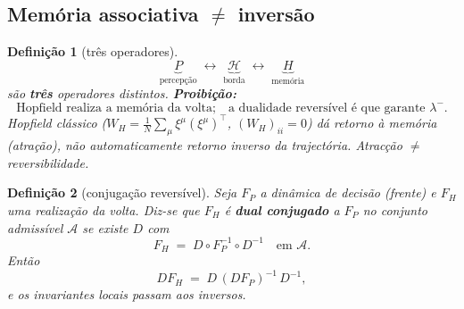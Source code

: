 \documentclass[11pt,a4paper]{article}
\newtheorem{definicao}{Definição}
\begin{document}
\subsection*{Memória associativa $\neq$ inversão}

\begin{definicao}[três operadores]\label{def:tres-ops}
\[
\boxed{
\underbrace{P}_{\text{percepção}}
\;\longleftrightarrow\;
\underbrace{\mathcal{H}}_{\text{borda}}
\;\longleftrightarrow\;
\underbrace{H}_{\text{memória}}
}
\]
são \textbf{três} operadores distintos. \textbf{Proibição:}
\[
\boxed{
\text{Hopfield realiza a memória da volta;}
\quad
\text{a dualidade reversível é que garante }\lambda^{-}.
}
\]
Hopfield clássico ($W_H=\frac1N\sum_{\mu}\xi^{\mu}(\xi^{\mu})^{\!\top}$,
$(W_H)_{ii}=0$) dá \emph{retorno à memória} (atração), não
automaticamente \emph{retorno inverso da trajectória}. Atracção $\neq$
reversibilidade.
\end{definicao}

\begin{definicao}[conjugação reversível]\label{def:conjugacao-D}
Seja $F_P$ a dinâmica de decisão (frente) e $F_H$ uma realização da
volta. Diz-se que $F_H$ é \textbf{dual conjugado} a $F_P$ no conjunto
admissível $\mathcal{A}$ se existe $D$ com
\[
\boxed{
F_H \;=\; D\circ F_P^{-1}\circ D^{-1}
\quad\text{em }\mathcal{A}.
}
\]
Então
\[
\boxed{DF_H \;=\; D\,(DF_P)^{-1}\,D^{-1}},
\]
e os invariantes locais passam aos inversos.
\end{definicao}
\end{document}
